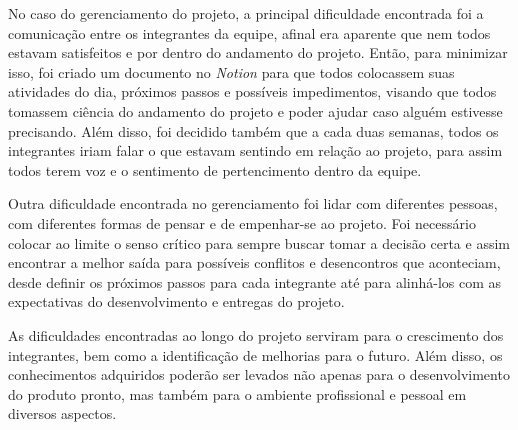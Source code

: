 \documentclass[
    12pt,               %
    openright,          %
    oneside,
    a4paper,            %
    english,            %
    brazil              %
    ]{ifsp-spo-inf-ctds} %
\begin{document}
No caso do gerenciamento do projeto, a principal dificuldade encontrada foi a comunicação entre os integrantes da equipe, afinal era aparente que nem todos estavam satisfeitos e por dentro do andamento do projeto. Então, para minimizar isso, foi criado um documento no \textit{Notion} para que todos colocassem suas atividades do dia, próximos passos e possíveis impedimentos, visando que todos tomassem ciência do andamento do projeto e poder ajudar caso alguém estivesse precisando. Além disso, foi decidido também que a cada duas semanas, todos os integrantes iriam falar o que estavam sentindo em relação ao projeto, para assim todos terem voz e o sentimento de pertencimento dentro da equipe.

Outra dificuldade encontrada no gerenciamento foi lidar com diferentes pessoas, com diferentes formas de pensar e de empenhar-se ao projeto. Foi necessário colocar ao limite o senso crítico para sempre buscar tomar a decisão certa e assim encontrar a melhor saída para possíveis conflitos e desencontros que aconteciam, desde definir os próximos passos para cada integrante até para alinhá-los com as expectativas do desenvolvimento e entregas do projeto.

As dificuldades encontradas ao longo do projeto serviram para o crescimento dos integrantes, bem como a identificação de melhorias para o futuro. Além disso, os conhecimentos adquiridos poderão ser levados não apenas para o desenvolvimento do produto pronto, mas também para o ambiente profissional e pessoal em diversos aspectos.







\end{document}
